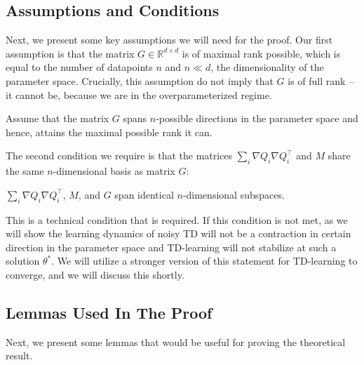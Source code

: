 \subsection{Assumptions and Conditions}
Next, we present some key assumptions we will need for the proof. Our first assumption is that the matrix $G \in \mathbb{R}^{d \times d}$ is of maximal rank possible, which is equal to the number of datapoints $n$ and $n \ll d$, the dimensionality of the parameter space. Crucially, this assumption do not imply that $G$ is of full rank -- it cannot be, because we are in the overparameterized regime. 
\begin{assumption}
\label{assumption:psd}
Assume that the matrix $G$ spans $n$-possible directions in the parameter space and hence, attains the maximal possible rank it can.
\end{assumption}

The second condition we require is that the matrices $\sum_i \nabla Q_i \nabla Q_i^\top$ and $M$ share the same $n$-dimensional basis as matrix $G$:
\begin{assumption}
\label{assumption:shared_basis}
$\sum_i \nabla Q_i \nabla Q_i^\top$, $M$, and $G$ span identical $n$-dimensional subspaces.
\end{assumption}
This is a technical condition that is required. If this condition is not met, as we will show the learning dynamics of noisy TD will not be a contraction in certain direction in the parameter space and TD-learning will not stabilize at such a solution $\theta^*$. We will utilize a stronger version of this statement for TD-learning to converge, and we will discuss this shortly.

\subsection{Lemmas Used In The Proof}
Next, we present some lemmas that would be useful for proving the theoretical result.  

